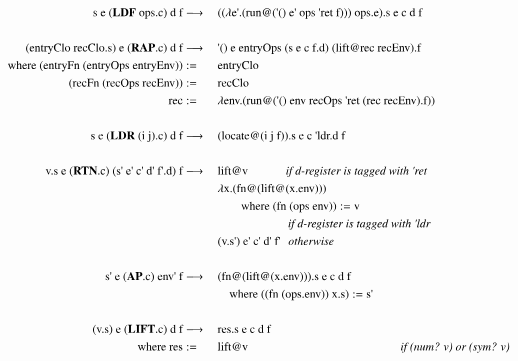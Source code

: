\documentclass[a4paper,12pt,twoside,openright]{report}
\theoremstyle{definition}
\newcommand{\ts}{\textquotesingle}
\begin{document}
\begingroup
\allowdisplaybreaks
\begin{figure}[htp!]
\centering
\begin{alignat}{5}
		\text{s e (} \mathbf{LDF} \text{ ops.c) d f} & \longrightarrow \: && \text{(($\lambda$e{\ts}.(run@({\ts}() e{\ts} ops {\ts}ret f))) ops.e).s e c d f} \label{eq:secd_sem_ldf} \\
		\nonumber \\%
		\text{(entryClo recClo.s) e (} \mathbf{RAP}\text{.c) d f} & \longrightarrow \: && \text{{\ts}() e entryOps (s e c f.d) (lift@rec recEnv).f} \label{eq:secd_sem_rap} \\
		\text{where (entryFn (entryOps entryEnv))} & := && \text{entryClo} \nonumber \\
		\text{(recFn (recOps recEnv))} & := && \text{recClo} \nonumber \\
		\text{rec} & := && \text{$\lambda$env.(run@({\ts}() env recOps {\ts}ret (rec recEnv).f))} \nonumber \\
		\nonumber \\%
		\text{s e (} \mathbf{LDR} \text{ (i j).c) d f} & \longrightarrow \: && \text{(locate@(i j f)).s e c {\ts}ldr.d f} \\
		\nonumber \\%
		\text{v.s e (} \mathbf{RTN}\text{.c) (s{\ts} e{\ts} c{\ts}  d{\ts}  f{\ts}.d) f} & \longrightarrow \:
		 && \text{lift@v} \qquad\quad\:\text{\textit{if d-register is tagged with {\ts}ret}}	\\
		 & && \text{$\lambda$x.(fn@(lift@(x.env)))} \nonumber \\
		 & && \qquad\text{where (fn (ops env))} := \text{v} \nonumber \\
		 & && \qquad\qquad\qquad\text{\textit{if d-register is tagged with {\ts}ldr}} \nonumber \\
 		 & && \text{(v.s{\ts})  e{\ts}  c{\ts}  d{\ts}  f{\ts}}	\:\:\:\text{\textit{otherwise}} \nonumber \\
 		\nonumber \\%
		\text{s{\ts} e (} \mathbf{AP}\text{.c) env{\ts} f} & \longrightarrow \: && \text{(fn@(lift@(x.env))).s e c d f} \\
		& && \quad\text{where ((fn (ops.env)) x.s)} := \text{s{\ts}} \nonumber \\
		\nonumber \\%
		\text{(v.s) e (} \mathbf{LIFT}\text{.c) d f} & \longrightarrow \: \label{eq:secd_sem_lift}
		 && \text{res.s e c d f}   \\
		 \text{where res} & := && \text{lift@v\qquad\qquad\qquad\qquad\qquad\qquad\quad\textit{if (num? v) or (sym? v)}} \nonumber \\

\end{alignat}
\end{figure}
\end{document}
